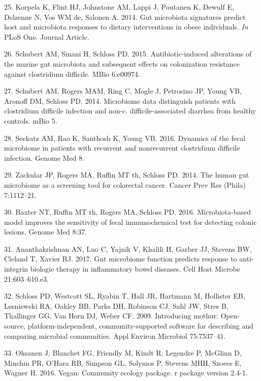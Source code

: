 \documentclass[11pt,]{article}
\begin{document}
\hypertarget{ref-Korpela_diet_2014}{}
25. Korpela K, Flint HJ, Johnstone AM, Lappi J, Poutanen K, Dewulf E,
Delzenne N, Vos WM de, Salonen A. 2014. Gut microbiota signatures
predict host and microbiota responses to dietary interventions in obese
individuals. \emph{In} PLoS One. Journal Article.

\hypertarget{ref-Schubert_cdiff_2016}{}
26. Schubert AM, Sinani H, Schloss PD. 2015. Antibiotic-induced
alterations of the murine gut microbiota and subsequent effects on
colonization resistance against clostridium difficile. MBio 6:e00974.

\hypertarget{ref-Schubert_cdiff_2014}{}
27. Schubert AM, Rogers MAM, Ring C, Mogle J, Petrosino JP, Young VB,
Aronoff DM, Schloss PD. 2014. Microbiome data distinguish patients with
clostridium difficile infection and non-c. difficile-associated diarrhea
from healthy controls. mBio 5.

\hypertarget{ref-Seekatz_cdiff_2016}{}
28. Seekatz AM, Rao K, Santhosh K, Young VB. 2016. Dynamics of the fecal
microbiome in patients with recurrent and nonrecurrent clostridium
difficile infection. Genome Med 8.

\hypertarget{ref-zackular_CRC_2014}{}
29. Zackular JP, Rogers MA, Ruffin MT th, Schloss PD. 2014. The human
gut microbiome as a screening tool for colorectal cancer. Cancer Prev
Res (Phila) 7:1112--21.

\hypertarget{ref-baxter_FIT_2016}{}
30. Baxter NT, Ruffin MT th, Rogers MA, Schloss PD. 2016.
Microbiota-based model improves the sensitivity of fecal immunochemical
test for detecting colonic lesions. Genome Med 8:37.

\hypertarget{ref-Ananthakrishnan_IBD_2017}{}
31. Ananthakrishnan AN, Luo C, Yajnik V, Khalili H, Garber JJ, Stevens
BW, Cleland T, Xavier RJ. 2017. Gut microbiome function predicts
response to anti-integrin biologic therapy in inflammatory bowel
diseases. Cell Host Microbe 21:603--610.e3.

\hypertarget{ref-schloss_mothur_2009}{}
32. Schloss PD, Westcott SL, Ryabin T, Hall JR, Hartmann M, Hollister
EB, Lesniewski RA, Oakley BB, Parks DH, Robinson CJ, Sahl JW, Stres B,
Thallinger GG, Van Horn DJ, Weber CF. 2009. Introducing mothur:
Open-source, platform-independent, community-supported software for
describing and comparing microbial communities. Appl Environ Microbiol
75:7537--41.

\hypertarget{ref-oksanen_vegan_2016}{}
33. Oksanen J, Blanchet FG, Friendly M, Kindt R, Legendre P, McGlinn D,
Minchin PR, O'Hara RB, Simpson GL, Solymos P, Stevens MHH, Szoecs E,
Wagner H. 2016. Vegan: Community ecology package. r package version
2.4-1.
\end{document}
